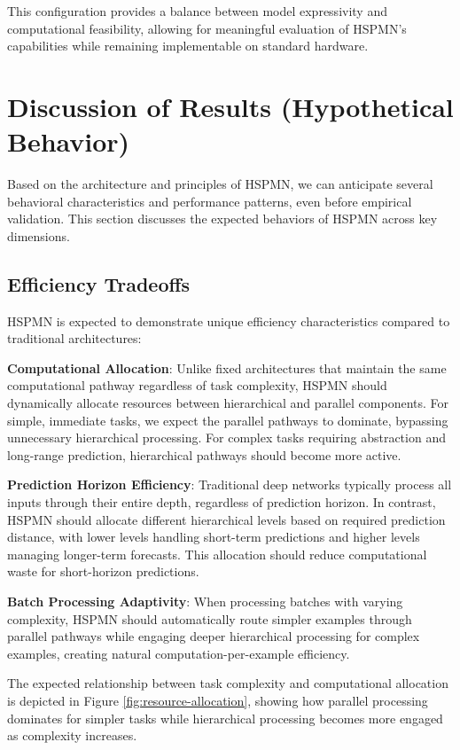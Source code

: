 \documentclass[11pt,a4paper,twocolumn]{article}
\begin{document}
This configuration provides a balance between model expressivity and computational feasibility, allowing for meaningful evaluation of HSPMN's capabilities while remaining implementable on standard hardware.

\section{Discussion of Results (Hypothetical Behavior)}

Based on the architecture and principles of HSPMN, we can anticipate several behavioral characteristics and performance patterns, even before empirical validation. This section discusses the expected behaviors of HSPMN across key dimensions.

\subsection{Efficiency Tradeoffs}

HSPMN is expected to demonstrate unique efficiency characteristics compared to traditional architectures:

\textbf{Computational Allocation}: Unlike fixed architectures that maintain the same computational pathway regardless of task complexity, HSPMN should dynamically allocate resources between hierarchical and parallel components. For simple, immediate tasks, we expect the parallel pathways to dominate, bypassing unnecessary hierarchical processing. For complex tasks requiring abstraction and long-range prediction, hierarchical pathways should become more active.

\textbf{Prediction Horizon Efficiency}: Traditional deep networks typically process all inputs through their entire depth, regardless of prediction horizon. In contrast, HSPMN should allocate different hierarchical levels based on required prediction distance, with lower levels handling short-term predictions and higher levels managing longer-term forecasts. This allocation should reduce computational waste for short-horizon predictions.

\textbf{Batch Processing Adaptivity}: When processing batches with varying complexity, HSPMN should automatically route simpler examples through parallel pathways while engaging deeper hierarchical processing for complex examples, creating natural computation-per-example efficiency.

The expected relationship between task complexity and computational allocation is depicted in Figure \ref{fig:resource-allocation}, showing how parallel processing dominates for simpler tasks while hierarchical processing becomes more engaged as complexity increases.
\end{document}
